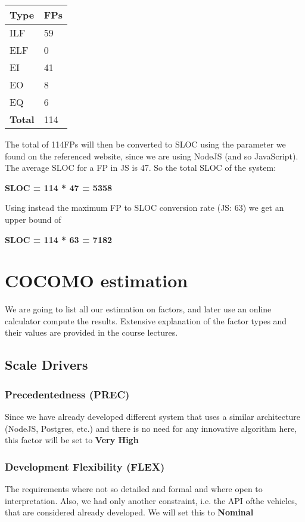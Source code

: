 \begin{center}
    \begin{tabular}{| l | l |}
    \hline
    \textbf{Type} & \textbf{FPs} \\ \hline
    ILF & 59 \\ \hline
    ELF & 0\\ \hline
    EI & 41\\ \hline
    EO & 8\\ \hline
    EQ & 6\\ \hline
    \hline
    \textbf{Total} & 114 \\ \hline
    \end{tabular}
\end{center}

The total of 114FPs will then be converted to SLOC using the parameter we found on the referenced website, since we are using NodeJS (and so JavaScript). The average SLOC for a FP in JS is 47. So the total SLOC of the system:
\bigbreak
\begin{center} \textbf{ SLOC = 114 * 47 = 5358} \end{center}
\bigbreak
Using instead the maximum FP to SLOC conversion rate (JS: 63) we get an upper bound of
\bigbreak
\begin{center} \textbf{ SLOC = 114 * 63 = 7182} \end{center}
\bigbreak

\clearpage
\section{COCOMO estimation}
We are going to list all our estimation on factors, and later use an online calculator compute the results. Extensive explanation of the factor types and their values are provided in the course lectures.
\subsection{Scale Drivers}
\subsubsection{Precedentedness (PREC)}
Since we have already developed different system that uses a similar architecture (NodeJS, Postgres, etc.) and there is no need for any innovative algorithm here, this factor will be set to \textbf{Very High}
\subsubsection{Development Flexibility (FLEX)}
The requirements where not so detailed and formal and where open to interpretation. Also, we had only another constraint, i.e. the API ofthe vehicles, that are considered already developed. We will set this to \textbf{Nominal}

